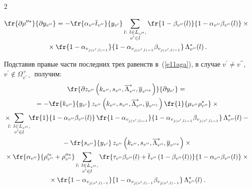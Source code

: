 \begin{multicols}{2}
     \vspace*{-12pt}
     
     \noindent
  \begin{multline*}
      \fr{\partial \rho_{}^{\prime\prime *}}{\partial y_{v^{\prime\prime}}}=
      -\fr{\alpha_{ v^{\prime\prime}} \overline{t}_{ v^{\prime\prime}}}{y_{v^\prime}}
      \sum\limits_{\substack{{l:\ l\in L_{ v^{\prime\prime}},}\\ {v^\prime\in l}}}
      \fr{1-\beta_{ v^{\prime\prime}}(l)}
      {1-\alpha_{ v^{\prime\prime}}\beta_{v^{\prime\prime}}(l)}\times{}\\
      {}\times
      \fr{1-\alpha_{v_{j(v^\prime,l)-1}}}{1-\alpha_{ v_{j(v^\prime,l)-1}}\beta_{ 
v_{j(v^\prime,l)-1}}}\, \Lambda^*_{ v^{\prime\prime}}(l)\,.
     \end{multline*}
   
   Подставив правые части последних трех равенств в~(\ref{e11aga}), в 
случае $v^\prime\not= v^{\prime\prime}$, $v^\prime\not\in 
\Omega^+_{v^{\prime\prime +}}$ получим:
   \begin{multline}
   \fr{\partial z_{ v^{\prime\prime}}\left(k_{ v^{\prime\prime}}, s_{ 
v^{\prime\prime}}, \overline{\Lambda}^*_{ v^{\prime\prime}}, \overline{y}_{ 
v^{\prime\prime +}}\right)}{\partial y_{v^\prime}}={}\\
{}=-
\fr{k_{v^{\prime\prime}}}{y_{v^\prime}}\,z_{v^{\prime\prime}}
\left(k_{v^{\prime\prime}}, s_{ v^{\prime\prime}}, 
\overline{\Lambda}_{v^{\prime\prime}}^*, \overline{y}_{ v^{\prime\prime +}}\right)
   \fr{1}{\mu_{ v^{\prime\prime}}\rho^*_{ v^{\prime\prime}}}\times{}\\
   \hspace*{-1pt}{}\times\hspace*{-5.5pt}
   \sum\limits_{\substack{{l:\ l\in L_{ v^{\prime\prime}},}\\ {v^\prime\in l}}} \hspace*{-4pt}
   \fr{1}{1-\alpha_{ v^{\prime\prime}}\beta_{v^{\prime\prime}}(l)}\,
   \fr{1-\alpha_{v_{j(v^\prime,l)-1}}}{1-\alpha_{ v_{j(v^\prime,l)-1}}
   \beta_{{v_{j(v^\prime,l)-1}}}}\,\Lambda^*_{ v^{\prime\prime}}(l)-{}\\
   {}-
   \fr{s_{ v^{\prime\prime}}}{y_{v^\prime}}\,z_{v^{\prime\prime}}
   \left(k_{ v^{\prime\prime}}, s_{ v^{\prime\prime}}, \overline{\Lambda}^*_{ 
v^{\prime\prime}}, \overline{y}_{ v^{\prime\prime +}}\right)\times{}\\
   {}\times \fr{\alpha_{ v^{\prime\prime}}}{\rho_{ v^{\prime\prime}}^{\prime 
*}+\rho_{ v^{\prime\prime}}^{\prime\prime *}}
   \sum\limits_{\substack{{l:\ l\in L_{ v^{\prime\prime}},}\\ {v^\prime\in l}}}
   \fr{\tau_{ v^{\prime\prime}} \beta_{ v^{\prime\prime}}(l) +\overline{t}_{ 
v^{\prime\prime}} \left(1-\beta_{ v^{\prime\prime}}(l)\right)}{1-
\alpha_{v^{\prime\prime}}\beta_{ v^{\prime\prime}}(l)}\times{}\\
{}\times
\fr{1- \alpha_{v_{j(v^\prime,l)-1}}}{1-\alpha_{v_{j(v^\prime,l)-
1}}\beta_{v_{j(v^\prime,l)-1}}}\,\Lambda^*_{ v^{\prime\prime}}(l)\,.
   \label{e13aga}
   \end{multline}
   
   \end{multicols}
   
